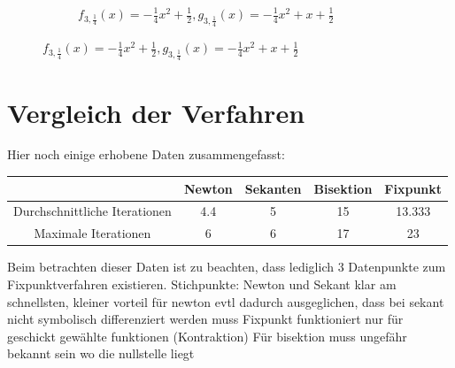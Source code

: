 \documentclass[10pt]{scrartcl}
\newcommand{\1}{1\hspace{-0,9ex}1}
\begin{document}
\begin{figure}[!h]
\begin{subfigure}[b]{0.4\textwidth}
			\caption*{$f_{3,\frac{1}{4}}(x) = -\frac{1}{4}x^2 +\frac{1}{2},  g_{3,\frac{1}{4}}(x)=-\frac{1}{4}x^2 + x + \frac{1}{2}$}
		\end{subfigure}
	\end{figure}
	\section*{Vergleich der Verfahren}
	Hier noch einige erhobene Daten zusammengefasst:
	\begin{table}[!h]
		\centering
		\begin{tabular}{|c|c|c|c|c|} \hline
									  & Newton & Sekanten & Bisektion & Fixpunkt \\ \hline
		Durchschnittliche Iterationen & 4.4                & 5                  & 15                   & 13.333             \\ \hline
		Maximale Iterationen          & 6                  & 6                  & 17                   & 23                 \\ \hline
		\end{tabular}
	\end{table}

	Beim betrachten dieser Daten ist zu beachten, dass lediglich 3 Datenpunkte zum Fixpunktverfahren existieren.
	Stichpunkte:
	Newton und Sekant klar am schnellsten, kleiner vorteil für newton evtl dadurch ausgeglichen, dass bei sekant nicht symbolisch differenziert werden muss
	Fixpunkt funktioniert nur für geschickt gewählte funktionen (Kontraktion)
	Für bisektion muss ungefähr bekannt sein wo die nullstelle liegt
\end{document}
